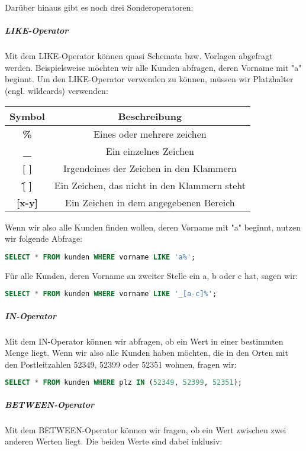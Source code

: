 \documentclass{article}
\begin{document}
	Darüber hinaus gibt es noch drei Sonderoperatoren:

	\subparagraph{LIKE-Operator}
	Mit dem LIKE-Operator können quasi Schemata bzw. Vorlagen abgefragt werden. Beispielsweise möchten wir alle Kunden abfragen, deren Vorname mit "a" beginnt.
	Um den LIKE-Operator verwenden zu können, müssen wir Platzhalter (engl. wildcards) verwenden:
	
	\begin{center}
		\def\arraystretch{1.1}
		\begin{tabular}{ | c | c |}
			\hline
			\textbf{Symbol} & \textbf{Beschreibung} \\
			\hline
			\hline
			\textbf{\%} & Eines oder mehrere zeichen \\
			\textbf{\_} & Ein einzelnes Zeichen \\
			\textbf{[ ]} & Irgendeines der Zeichen in den Klammern \\
			\textbf{\^ [  ]} & Ein Zeichen, das nicht in den Klammern steht \\
			\textbf{[x-y]} & Ein Zeichen in dem angegebenen Bereich \\
			\hline
		\end{tabular}
	\end{center}

	Wenn wir also alle Kunden finden wollen, deren Vorname mit "a" beginnt, nutzen wir folgende Abfrage:

	\begin{lstlisting}[language=SQL]
	SELECT * FROM kunden WHERE vorname LIKE 'a%';
	\end{lstlisting}

	Für alle Kunden, deren Vorname an zweiter Stelle ein a, b oder c hat, sagen wir:

	\begin{lstlisting}[language=SQL]
	SELECT * FROM kunden WHERE vorname LIKE '_[a-c]%';
	\end{lstlisting}

	\subparagraph{IN-Operator}
	Mit dem IN-Operator können wir abfragen, ob ein Wert in einer bestimmten Menge liegt. Wenn wir also alle Kunden haben möchten, die in den Orten mit den Postleitzahlen 52349, 52399 oder 52351 wohnen, fragen wir:

	\begin{lstlisting}[language=SQL]
	SELECT * FROM kunden WHERE plz IN (52349, 52399, 52351);
	\end{lstlisting}

	\subparagraph{BETWEEN-Operator}
	Mit dem BETWEEN-Operator können wir fragen, ob ein Wert zwischen zwei anderen Werten liegt. Die beiden Werte sind dabei inklusiv:
\end{document}
